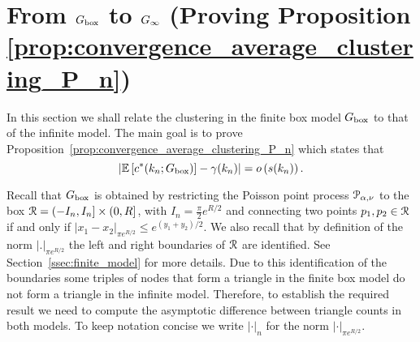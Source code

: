 \section{From $G_{\mathrm{box}}$ to $G_{\infty}$ (Proving Proposition \ref{prop:convergence_average_clustering_P_n})}\label{sec:clustering_Pn_to_P}

In this section we shall relate the clustering in the finite box model $G_{\mathrm{box}}$ to that of the infinite model. The main goal is to prove Proposition~\ref{prop:convergence_average_clustering_P_n} which states that
\[
	\left|\mathbb{E}\left[c^\ast(k_n; G_{\mathrm{box}})\right] - \gamma(k_n)\right| = o\left(s(k_n)\right).
\] 

Recall that $G_{\mathrm{box}}$ is obtained by restricting the Poisson point process ${\mathcal P}_{\alpha, \nu}$ to the box ${\mathcal R} = (-I_n, I_n] \times (0, R]$, with $I_n = \frac{\pi}{2} e^{R/2}$ and connecting two points $p_1, p_2 \in {\mathcal R}$ if and only if $|x_1 - x_2|_{\pi e^{R/2}} \le e^{(y_1 + y_2)/2}$. We also recall that by definition of the norm $|.|_{\pi e^{R/2}}$ the left and right boundaries of ${\mathcal R}$ are identified. See Section~\ref{ssec:finite_model} for more details. Due to this identification of the boundaries some triples of nodes that form a triangle in the finite box model do not form a triangle in the infinite model. Therefore, to establish the required result we need to compute the asymptotic difference between triangle counts in both models. To keep notation concise we write $|\cdot|_n$ for the norm $|\cdot|_{\pi e^{R/2}}$.


